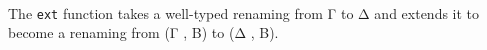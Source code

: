 \begin{fence}
\begin{code}%
\>[0]\AgdaSpace{}%
\AgdaSymbol{:}\AgdaSpace{}%
\AgdaSymbol{(}\AgdaSpace{}%
\AgdaSpace{}%
\AgdaSymbol{)}\AgdaSpace{}%
\AgdaSpace{}%
\AgdaSpace{}%
\AgdaSpace{}%
\AgdaSpace{}%
\AgdaSpace{}%
\<%
\\
\>[0]\AgdaSpace{}%
\AgdaSpace{}%
\AgdaSpace{}%
\AgdaSpace{}%
\AgdaSpace{}%
\AgdaSymbol{=}\AgdaSpace{}%
\AgdaSpace{}%
\AgdaSymbol{\{}\AgdaSpace{}%
\AgdaSymbol{\}}\AgdaSpace{}%
\AgdaSpace{}%
\AgdaSpace{}%
\AgdaSpace{}%
\AgdaSpace{}%
\AgdaSpace{}%
\AgdaSpace{}%
\AgdaSpace{}%
\AgdaSpace{}%
\AgdaSpace{}%
\AgdaSpace{}%
\AgdaSpace{}%
\AgdaSpace{}%
\<%
\end{code}
\end{fence}

The \texttt{ext} function takes a well-typed renaming from Γ to Δ and
extends it to become a renaming from (Γ , B) to (Δ , B).

